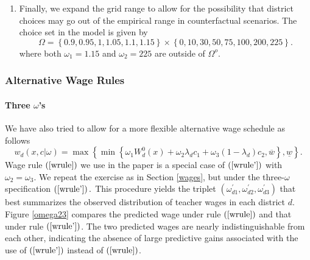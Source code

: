 \documentclass[notitlepage,12pt]{article}%
\begin{document}
\begin{enumerate}
\begin{itemize}
\item The $(\omega_{d1}^{o},\omega_{d2}^{o})$ selected with this procedure
predicts teachers' actual salaries quite well: 1) the absolute percentage
deviation of predicted wages from actual wages in 2014, i.e., $\left\vert
1-\frac{w_{d}\left(  x_{i},c_{i};\omega\right)  }{w_{i}}\right\vert ,$ is less
than 10\% for 95\% of teachers in our sample; and 2) regressing $w_{i}$ on
$w_{d}\left(  x_{i},c_{i};\omega\right)  $ yields a slope coefficient of 0.98
(with a standard error of 0.001) and an R$^{2}$ of 0.99.
\end{itemize}

\item Finally, we expand the grid range to allow for the possibility that
district choices may go out of the empirical range in counterfactual
scenarios. The choice set in the model is given by%
\[
\Omega=\left\{  0.9,0.95,1,1.05,1.1,1.15\right\}  \times\left\{
0,10,30,50,75,100,200,225\right\}  .
\]
where both $\omega_{1}=1.15$ and $\omega_{2}=225$ are outside of $\Omega^{o}$.
\end{enumerate}

\subsubsection{Alternative Wage Rules}

\paragraph{Three $\omega$'s}

We have also tried to allow for a more flexible alternative wage schedule as
follows
\begin{equation}
w_{d}\left(  x,c|\omega\right)  =\max\left\{  \min\left\{  \omega_{1}W_{d}%
^{0}\left(  x\right)  +\omega_{2}\lambda_{d}c_{1}+\omega_{3}\left(
1-\lambda_{d}\right)  c_{2},\overline{w}\right\}  ,\underline{w}\right\}  .
\label{wrule'}%
\end{equation}
Wage rule $\left(  \ref{wrule}\right)  $ we use in the paper is a special case
of $\left(  \ref{wrule'}\right)  $ with $\omega_{2}=\omega_{3}.$ We repeat the
exercise as in Section \ref{wages}, but under the three-$\omega$ specification
$\left(  \ref{wrule'}\right)  .$ This procedure yields the triplet
$(\omega_{d1}^{\prime},\omega_{d2}^{\prime},\omega_{d3}^{\prime})$ that best
summarizes the observed distribution of teacher wages in each district $d.$
Figure \ref{omega23} compares the predicted wage under rule $\left(
\ref{wrule}\right)  $ and that under rule $\left(  \ref{wrule'}\right)  $. The
two predicted wages are nearly indistinguishable from each other, indicating
the absence of large predictive gains associated with the use of $\left(
\ref{wrule'}\right)  $ instead of $\left(  \ref{wrule}\right)  $.
\end{document}
